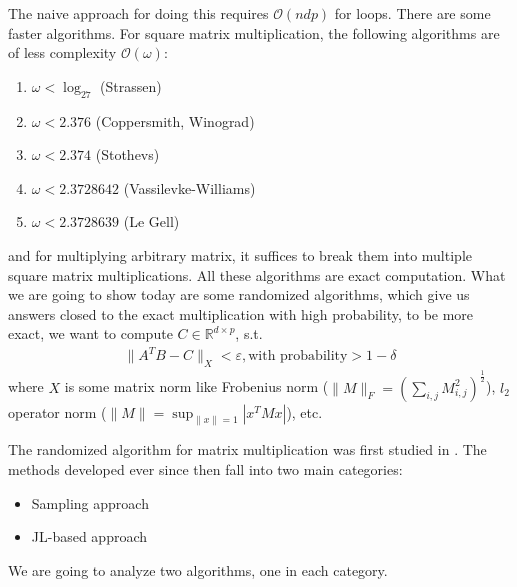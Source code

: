 \documentclass[11pt]{article}
\begin{document}
The naive approach for doing this requires $\mathcal{O}(ndp)$ for loops. There are some faster algorithms. For square matrix multiplication, the following algorithms are of less complexity $\mathcal{O}(\omega)$:
\begin{enumerate}
\item $\omega<\log_27$ (Strassen)
\item $\omega< 2.376$ (Coppersmith, Winograd)
\item $\omega<2.374$ (Stothevs)
\item $\omega<2.3728642$ (Vassilevke-Williams)
\item $\omega<2.3728639$ (Le Gell)
\end{enumerate}
 and for multiplying arbitrary matrix, it suffices to break them into multiple square matrix multiplications. All these algorithms are exact computation. What we are going to show today are some randomized algorithms, which give us answers closed to the exact multiplication with high probability, to be more exact, we want to compute $C\in \mathbb{R}^{d\times p}$, s.t.
\begin{align*}
\|A^TB-C\|_X<\varepsilon, \text{with probability}>1-\delta
\end{align*}
where $X$ is some matrix norm like Frobenius norm ($\|M\|_F = (\sum_{i,j}M_{i,j}^2)^{\frac{1}{2}}$), $l_2$ operator norm ($\|M\|=\sup_{\|x\|=1}|x^TMx|$), etc.

The randomized algorithm for matrix multiplication was first studied in \cite{Drineas06}. The methods developed ever since then fall into two main categories:
\begin{itemize}
\item
Sampling approach
\item
JL-based approach
\end{itemize}
We are going to analyze two algorithms, one in each category.
\end{document}
